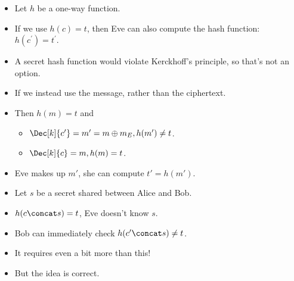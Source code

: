 \begin{frame}
  \begin{example}
    \begin{itemize}
      \item Let \(h\) be a one-way function.
        
        \pause{}
        
      \item If we use \(h(c) = t\), then Eve can also compute the hash 
        function: \(h(c^\prime) = t^\prime\).

        \pause{}

      \item A secret hash function would violate Kerckhoff's principle, so 
        that's not an option.

        \pause{}

      \item If we instead use the message, rather than the ciphertext.
        
      \item Then \(h(m) = t\) and
        \begin{itemize}
          \item \(\Dec[k]{c^\prime} = m^\prime = m\oplus m_E, h(m^\prime)\neq 
              t\).
          \item \(\Dec[k]{c} = m, h(m) = t\).
        \end{itemize}

        \pause{}
        
      \item Eve makes up \(m'\), she can compute \(t' = h(m')\).
    \end{itemize}
  \end{example}
\end{frame}

\begin{frame}
  \begin{solution}
    \begin{itemize}
      \item Let \(s\) be a secret shared between Alice and Bob.

        \pause{}

      \item \(h(c\concat s) = t\), Eve doesn't know \(s\).
      \item Bob can immediately check \(h(c^\prime\concat s)\neq t\).
    \end{itemize}
  \end{solution}

  \pause{}

  \begin{remark}
    \begin{itemize}
      \item It requires even a bit more than this!
      \item But the idea is correct.
    \end{itemize}
  \end{remark}
\end{frame}

